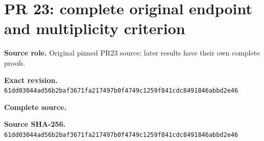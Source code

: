 \begingroup
\sloppy
\small
\clearpage
\section{PR 23: complete original endpoint and multiplicity criterion}
\noindent\textbf{Source role.} Original pinned PR23 source; later results have their own complete proofs.\par
\noindent\textbf{Exact revision.} \nolinkurl{61dd03044ad56b2baf3671fa217497b0f4749c1259f841cdc8491846abbd2e46}\par
\noindent\textbf{Complete source.} \par
\noindent\textbf{Source SHA-256.} \nolinkurl{61dd03044ad56b2baf3671fa217497b0f4749c1259f841cdc8491846abbd2e46}\par\medskip

\endgroup
